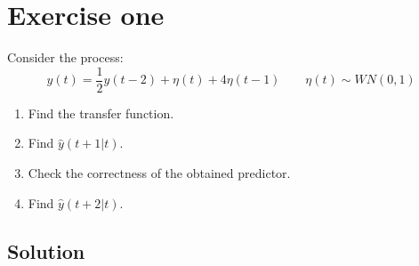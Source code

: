 \section{Exercise one}

Consider the process: 
\[y(t)=\dfrac{1}{2}y(t-2)+\eta(t)+4\eta(t-1)\qquad \eta(t)\sim WN(0,1)\]
\begin{enumerate}
    \item Find the transfer function. 
    \item Find $\hat{y}(t+1|t)$. 
    \item Check the correctness of the obtained predictor. 
    \item Find $\hat{y}(t+2|t)$. 
\end{enumerate}

\subsection{Solution}
